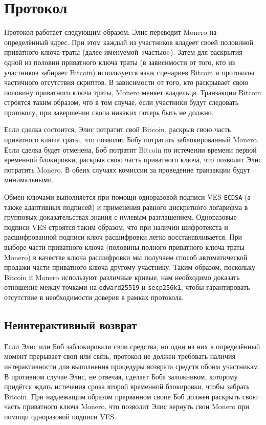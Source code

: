 \documentclass{llncs}
\begin{document}
\section{Протокол}
Протокол работает следующим образом: Элис переводит Monero на определённый адрес. При этом каждый из участников владеет своей половиной приватного ключа траты (далее именуемой «частью»). Затем для раскрытия одной из половин приватного ключа траты (в зависимости от того, кто из участников забирает Bitcoin) используется язык сценариев Bitcoin и протоколы частичного отсутствия скриптов. В зависимости от того, кто раскрывает свою половину приватного ключа траты, Monero меняет владельца. Транзакции Bitcoin строятся таким образом, что в том случае, если участники будут следовать протоколу, при завершении свопа никаких потерь быть не должно.

Если сделка состоится, Элис потратит свой Bitcoin, раскрыв свою часть приватного ключа траты, что позволит Бобу потратить заблокированный Monero. Если сделка будет отменена, Боб потратит Bitcoin по истечении времени первой временной блокировки, раскрыв свою часть приватного ключа, что позволит Элис потратить Monero. В обеих случаях комиссии за проведение транзакции будут минимальными.

Обмен ключами выполняется при помощи одноразовой подписи VES \texttt{ECDSA} (а также адаптивных подписей) и применения равного дискретного логарифма в групповых доказательствах знания с нулевым разглашением. Одноразовые подписи VES строятся таким образом, что при наличии шифротекста и расшифрованной подписи ключ расшифровки легко восстанавливается. При выборе части приватного ключа (половины полного приватного ключа траты Monero) в качестве ключа расшифровки мы получаем способ автоматической продажи части приватного ключа другому участнику. Таким образом, поскольку Bitcoin и Monero используют различные кривые, нам необходимо доказать отношение между точками на \texttt{edward25519} и \texttt{secp256k1}, чтобы гарантировать отсутствие в необходимости доверия в рамках протокола.

\subsection{Неинтерактивный возврат}
Если Элис или Боб заблокировали свои средства, но один из них в определённый момент прерывает своп или связь, протокол не должен требовать наличия интерактивности для выполнения процедуры возврата средств обоим участникам.  В противном случае Элис, не отвечая, сделает Боба заложником, которому придётся ждать истечения срока второй временной блокировки, чтобы забрать Bitcoin. При надлежащим образом прерванном свопе Боб должен раскрыть свою часть приватного ключа Monero, что позволит Элис вернуть свои Monero при помощи одноразовой подписи VES.
\end{document}
